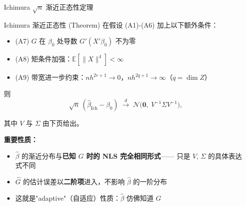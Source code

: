 \documentclass[aspectratio=169, 10pt]{beamer}
\begin{document}
\begin{frame}{Ichimura $\sqrt{n}$ 渐近正态性定理}

  \begin{definitionbox}{{Ichimura 渐近正态性 (Theorem)}}
    在假设 (A1)-(A6) 加上以下额外条件：
    \begin{itemize}\setlength{\itemsep}{1pt}
      \item (A7) $G$ 在 $\beta_0$ 处导数 $G'(X'\beta_0)$ 不为零
      \item (A8) 矩条件加强：$\mathbb{E}[\|X\|^4] < \infty$
      \item (A9) 带宽进一步约束：$nh^{2r+1} \to 0$，$nh^{2q+1} \to \infty$（$q = \dim Z$）
    \end{itemize}

    则
    $$\sqrt{n}\,(\hat\beta_{\text{Ich}} - \beta_0) \;\overset{d}{\to}\;
    \mathcal{N}\!\bigl(\mathbf{0},\; V^{-1}\Sigma V^{-1}\bigr),$$

    其中 $V$ 与 $\Sigma$ 由下页给出。
  \end{definitionbox}

  \begin{keybox}
    \textbf{重要性质：}
    \begin{itemize}\setlength{\itemsep}{1pt}
      \item $\hat\beta$ 的渐近分布与\textbf{已知 $G$ 时的 NLS 完全相同形式}——
      只是 $V$, $\Sigma$ 的具体表达式不同
      \item $\hat G$ 的估计误差以\textbf{二阶项}进入，不影响 $\hat\beta$ 的一阶分布
      \item 这就是"adaptive"（自适应）性质：$\hat\beta$ 仿佛知道 $G$
    \end{itemize}
  \end{keybox}

  \hypertarget{main-c6}{}
  \hfill{\scriptsize\hyperlink{proof-c6}{}}

\end{frame}
\end{document}
